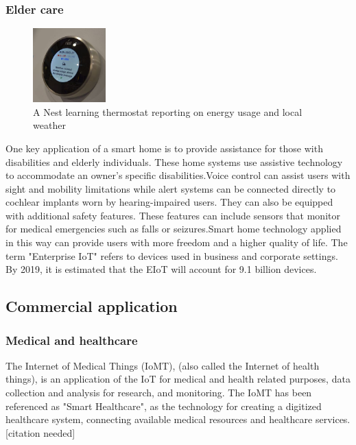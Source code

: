 \documentclass[12pt, a4paper, twoside]{article}
\begin{document}
\subsubsection{Elder care}
\begin{figure} %
    \centering
    \includegraphics[width=0.25\textwidth]{anl}
    \caption{A Nest learning thermostat reporting on energy usage and local weather}
\end{figure}
One key application of a smart home is to provide assistance for those with disabilities and elderly individuals. These home systems use assistive technology to accommodate an owner's specific disabilities.Voice control can assist users with sight and mobility limitations while alert systems can be connected directly to cochlear implants worn by hearing-impaired users. They can also be equipped with additional safety features. These features can include sensors that monitor for medical emergencies such as falls or seizures.Smart home technology applied in this way can provide users with more freedom and a higher quality of life.
The term "Enterprise IoT" refers to devices used in business and corporate settings. By 2019, it is estimated that the EIoT will account for 9.1 billion devices.

\subsection{Commercial application}
\subsubsection{Medical and healthcare}
The Internet of Medical Things (IoMT), (also called the Internet of health things), is an application of the IoT for medical and health related purposes, data collection and analysis for research, and monitoring. The IoMT has been referenced as "Smart Healthcare", as the technology for creating a digitized healthcare system, connecting available medical resources and healthcare services.[citation needed]
\end{document}
